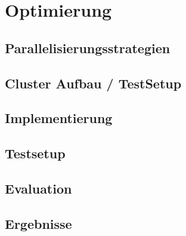 \chapter{Optimierung}



\section{Parallelisierungsstrategien}
\section{Cluster Aufbau / TestSetup}
\section{Implementierung}
\section{Testsetup}
\section{Evaluation}
\section{Ergebnisse}